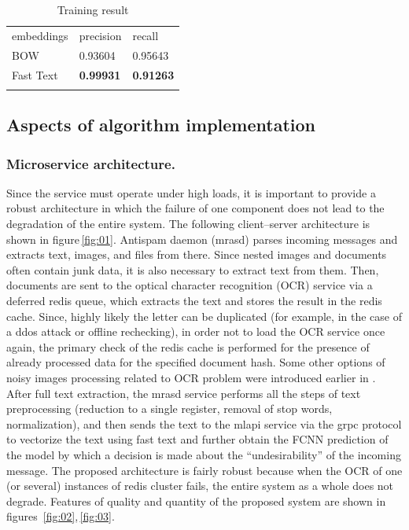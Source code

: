 \documentclass[12pt]{jpconf}
\begin{document}
\begin{table}[h!]
	\centering
	\caption{\label{tbl:02}Training result}
	\begin{center}
		\begin{tabular}{lll}
			\br
			embeddings & precision & recall \\
			\mr
			BOW & 0.93604 & 0.95643 \\ \hline
			Fast Text & \bf 0.99931 & \bf 0.91263 \\ 
			\br
		\end{tabular}
	\end{center}
\end{table}


\subsection{Aspects of algorithm implementation}

\subsubsection*{Microservice architecture.}

Since the service must operate under high loads, it is important to provide a robust architecture in which the failure of one component does not lead to the degradation of the entire system. The following client--server architecture is shown in figure\,\ref{fig:01}. Antispam daemon (mrasd) parses incoming messages and extracts text, images, and files from there. Since nested images and documents often contain junk data, it is also necessary to extract text from them. Then, documents are sent to the optical character recognition (OCR) service via a deferred redis queue, which extracts the text and stores the result in the redis cache.
Since, highly likely the letter can be duplicated (for example, in the case of a ddos attack or offline rechecking), in order not to load the OCR service once again, the primary check of the redis cache is performed for the presence of already processed data for the specified document hash.
Some other options of noisy images processing related to OCR problem were introduced earlier in \cite{Churikov2004,Kravchenko2005}.
After full text extraction, the mrasd service performs all the steps of text preprocessing (reduction to a single register, removal of stop words, normalization), and then sends the text to the mlapi service via the grpc protocol to vectorize the text using fast text and further obtain the FCNN prediction of the model by which a decision is made about the ``undesirability'' of the incoming message.
The proposed architecture is fairly robust because when the OCR of one (or several) instances of redis cluster fails, the entire system as a whole does not degrade. Features of quality and quantity of the proposed system are shown in figures~\ref{fig:02},\,\ref{fig:03}.
\end{document}
